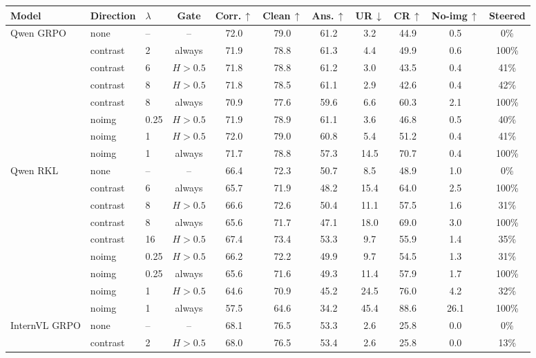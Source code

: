 \begin{table}[p]
\centering\footnotesize
\setlength{\tabcolsep}{4pt}
\begin{tabular}{lllcccccccc}
\toprule
Model & Direction & $\lambda$ & Gate & Corr.\,$\uparrow$ & Clean\,$\uparrow$ & Ans.\,$\uparrow$ & UR\,$\downarrow$ & CR\,$\uparrow$ & No-img\,$\uparrow$ & Steered \\
\midrule
Qwen GRPO & none & -- & -- & 72.0 & 79.0 & 61.2 & 3.2 & 44.9 & 0.5 & 0\% \\
 & contrast & 2 & always & 71.9 & 78.8 & 61.3 & 4.4 & 49.9 & 0.6 & 100\% \\
 & contrast & 6 & $H{>}0.5$ & 71.8 & 78.8 & 61.2 & 3.0 & 43.5 & 0.4 & 41\% \\
 & contrast & 8 & $H{>}0.5$ & 71.8 & 78.5 & 61.1 & 2.9 & 42.6 & 0.4 & 42\% \\
 & contrast & 8 & always & 70.9 & 77.6 & 59.6 & 6.6 & 60.3 & 2.1 & 100\% \\
 & noimg & 0.25 & $H{>}0.5$ & 71.9 & 78.9 & 61.1 & 3.6 & 46.8 & 0.5 & 40\% \\
 & noimg & 1 & $H{>}0.5$ & 72.0 & 79.0 & 60.8 & 5.4 & 51.2 & 0.4 & 41\% \\
 & noimg & 1 & always & 71.7 & 78.8 & 57.3 & 14.5 & 70.7 & 0.4 & 100\% \\
\midrule
Qwen RKL & none & -- & -- & 66.4 & 72.3 & 50.7 & 8.5 & 48.9 & 1.0 & 0\% \\
 & contrast & 6 & always & 65.7 & 71.9 & 48.2 & 15.4 & 64.0 & 2.5 & 100\% \\
 & contrast & 8 & $H{>}0.5$ & 66.6 & 72.6 & 50.4 & 11.1 & 57.5 & 1.6 & 31\% \\
 & contrast & 8 & always & 65.6 & 71.7 & 47.1 & 18.0 & 69.0 & 3.0 & 100\% \\
 & contrast & 16 & $H{>}0.5$ & 67.4 & 73.4 & 53.3 & 9.7 & 55.9 & 1.4 & 35\% \\
 & noimg & 0.25 & $H{>}0.5$ & 66.2 & 72.2 & 49.9 & 9.7 & 54.5 & 1.3 & 31\% \\
 & noimg & 0.25 & always & 65.6 & 71.6 & 49.3 & 11.4 & 57.9 & 1.7 & 100\% \\
 & noimg & 1 & $H{>}0.5$ & 64.6 & 70.9 & 45.2 & 24.5 & 76.0 & 4.2 & 32\% \\
 & noimg & 1 & always & 57.5 & 64.6 & 34.2 & 45.4 & 88.6 & 26.1 & 100\% \\
\midrule
InternVL GRPO & none & -- & -- & 68.1 & 76.5 & 53.3 & 2.6 & 25.8 & 0.0 & 0\% \\
 & contrast & 2 & $H{>}0.5$ & 68.0 & 76.5 & 53.4 & 2.6 & 25.8 & 0.0 & 13\% \\

\end{tabular}
\end{table}
